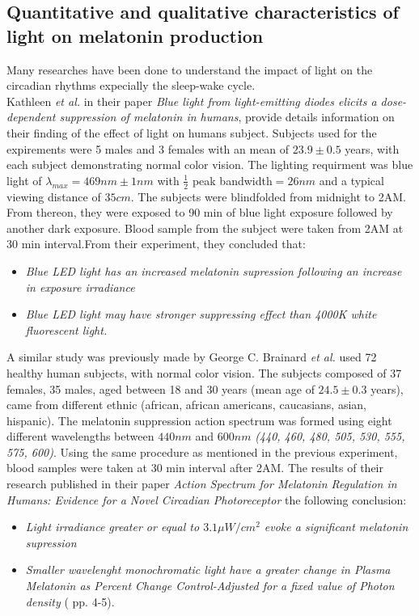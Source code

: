 \subsection{Quantitative and qualitative characteristics of light on melatonin production}
Many researches have been done to understand the impact of light on the circadian rhythms expecially the sleep-wake cycle. \\
Kathleen \textit{et al.} in their paper \textit{Blue light from light-emitting diodes elicits a dose-dependent suppression of melatonin in humans}\cite{bl2010}, provide details information on their finding of  the effect of light on humans subject. Subjects used for the expirements were 5 males and 3 females with an mean of $23.9\pm0.5$ years, with each subject demonstrating normal color vision. The lighting requirment was blue light of $\lambda_{max} = 469nm \pm 1nm $ with $\frac{1}{2}$ peak bandwidth$ = 26nm$ and a typical viewing distance of $35cm$. The subjects were blindfolded from midnight to 2AM. From thereon, they were exposed to 90 min of blue light exposure  followed by another dark exposure. Blood sample from the subject were taken from 2AM at 30 min interval.From their experiment, they concluded that:
\begin{itemize}
\item \textit{Blue LED light has an increased melatonin supression following an increase in exposure irradiance}
\item \textit{Blue LED light may have stronger suppressing effect than 4000K white fluorescent light.}
\end{itemize}
A similar study was previously made by George C. Brainard \textit{et al.} \cite{ac2001} used 72 healthy human subjects, with normal color vision. The subjects composed of 37 females, 35 males, aged between 18 and 30 years (mean age of $24.5 \pm 0.3$ years), came from different ethnic (african, african americans, caucasians, asian, hispanic). The melatonin suppression action spectrum was formed using eight different wavelengths between $440nm$ and $600nm$ \textit{(440, 460, 480, 505, 530, 555, 575, 600)}. Using the same procedure as mentioned in the previous experiment, blood samples were taken at 30 min interval after 2AM. The results of their research published in their paper \textit{Action Spectrum for Melatonin Regulation in Humans: Evidence for a Novel Circadian Photoreceptor} the following conclusion:
\begin{itemize}
\item \textit{Light irradiance greater or equal to $3.1 \mu W/cm^{2}$ evoke a significant melatonin supression}
\item \textit{Smaller wavelenght monochromatic light have a greater change in \textit{Plasma Melatonin as Percent Change Control-Adjusted} for a fixed value of \textit{Photon density}} (\cite{ac2001} pp. 4-5).
\end{itemize}   

